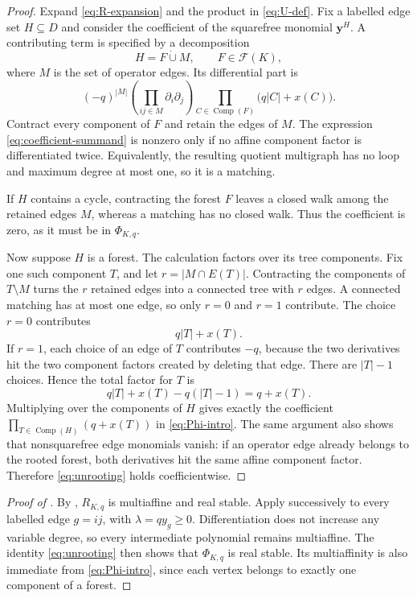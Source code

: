 \documentclass[11pt]{article}
\numberwithin{equation}{section}
\newcommand{\cF}{\mathcal F}
\newcommand{\yy}{\bm y}
\newcommand{\Comp}{\operatorname{Comp}}
\begin{document}
\begin{proof}
Expand \eqref{eq:R-expansion} and the product in \eqref{eq:U-def}.  Fix a labelled edge set $H\subseteq D$ and consider the coefficient of the squarefree monomial $\yy^H$.  A contributing term is specified by a decomposition
\[
 H=F\mathbin{\dot\cup}M,
 \qquad F\in\cF(K),
\]
where $M$ is the set of operator edges.  Its differential part is
\begin{equation}\label{eq:coefficient-summand}
 (-q)^{|M|}
 \left(\prod_{ij\in M}\partial_i\partial_j\right)
 \prod_{C\in\Comp(F)}\bigl(q|C|+x(C)\bigr).
\end{equation}
Contract every component of $F$ and retain the edges of $M$.  The expression \eqref{eq:coefficient-summand} is nonzero only if no affine component factor is differentiated twice.  Equivalently, the resulting quotient multigraph has no loop and maximum degree at most one, so it is a matching.

If $H$ contains a cycle, contracting the forest $F$ leaves a closed walk among the retained edges $M$, whereas a matching has no closed walk.  Thus the coefficient is zero, as it must be in $\Phi_{K,q}$.

Now suppose $H$ is a forest.  The calculation factors over its tree components.  Fix one such component $T$, and let $r=|M\cap E(T)|$.  Contracting the components of $T\setminus M$ turns the $r$ retained edges into a connected tree with $r$ edges.  A connected matching has at most one edge, so only $r=0$ and $r=1$ contribute.  The choice $r=0$ contributes
\[
 q|T|+x(T).
\]
If $r=1$, each choice of an edge of $T$ contributes $-q$, because the two derivatives hit the two component factors created by deleting that edge.  There are $|T|-1$ choices.  Hence the total factor for $T$ is
\[
 q|T|+x(T)-q(|T|-1)=q+x(T).
\]
Multiplying over the components of $H$ gives exactly the coefficient
$\prod_{T\in\Comp(H)}(q+x(T))$ in \eqref{eq:Phi-intro}.  The same argument also shows that nonsquarefree edge monomials vanish: if an operator edge already belongs to the rooted forest, both derivatives hit the same affine component factor.  Therefore \eqref{eq:unrooting} holds coefficientwise.
\end{proof}

\begin{proof}[Proof of ]
By , $R_{K,q}$ is multiaffine and real stable.  Apply  successively to every labelled edge $g=ij$, with $\lambda=qy_g\geq0$.  Differentiation does not increase any variable degree, so every intermediate polynomial remains multiaffine.  The identity \eqref{eq:unrooting} then shows that $\Phi_{K,q}$ is real stable.  Its multiaffinity is also immediate from \eqref{eq:Phi-intro}, since each vertex belongs to exactly one component of a forest.
\end{proof}
\end{document}
